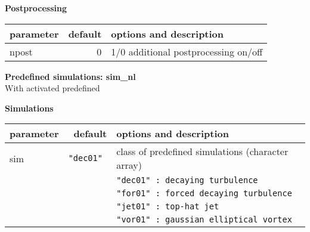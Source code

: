 \vspace{0.5cm}

\noindent
{\bf Postprocessing} \\
\noindent
\begin{tabular}{|l|r|l|}
 \hline
 parameter & default & options and description \\
 \hline
 npost        &  0       & 1/0 additional postprocessing on/off \\
 \hline
\end{tabular}

\vspace{0.5cm}
\noindent
{\bf \Large Predefined simulations: sim{\_}nl} \\
With activated predefined     

{\bf Simulations} \\
\noindent
\begin{tabular}{|l|r|l|}
 \hline
 parameter & default & options and description \\
 \hline
 sim          &  \tt{"dec01"} & class of predefined simulations (character array) \\
              &                & \tt{"dec01"} : decaying turbulence \\
              &                & \tt{"for01"} : forced decaying turbulence \\
              &                & \tt{"jet01"} : top-hat jet \\
              &                & \tt{"vor01"} : gaussian elliptical vortex \\
 \hline
\end{tabular}
